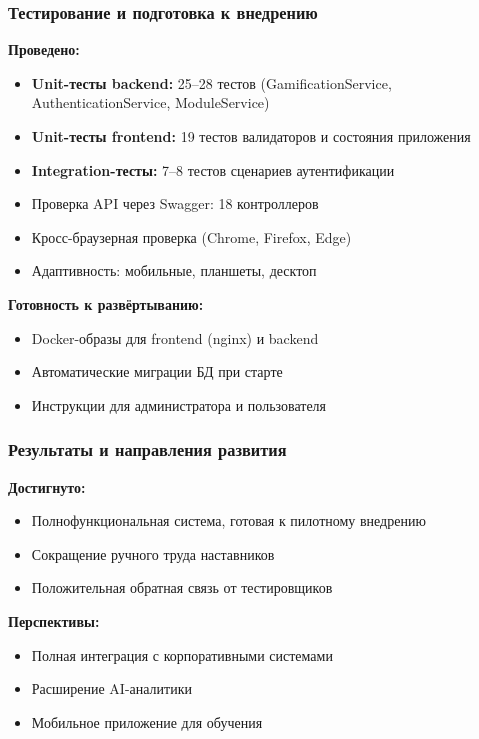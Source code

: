 \documentclass{beamer}
\begin{document}
\begin{frame}
    \frametitle{Тестирование и подготовка к внедрению}
    
    \textbf{Проведено:}
    \begin{itemize}
        \item \textbf{Unit-тесты backend:} 25--28 тестов (GamificationService, AuthenticationService, ModuleService)
        \item \textbf{Unit-тесты frontend:} 19 тестов валидаторов и состояния приложения
        \item \textbf{Integration-тесты:} 7--8 тестов сценариев аутентификации
        \item Проверка API через Swagger: 18 контроллеров
        \item Кросс-браузерная проверка (Chrome, Firefox, Edge)
        \item Адаптивность: мобильные, планшеты, десктоп
    \end{itemize}
    
    \vspace{0.3cm}
    \textbf{Готовность к развёртыванию:}
    \begin{itemize}
        \item Docker-образы для frontend (nginx) и backend
        \item Автоматические миграции БД при старте
        \item Инструкции для администратора и пользователя
    \end{itemize}
\end{frame}

\begin{frame}
    \frametitle{Результаты и направления развития}
    
    \textbf{Достигнуто:}
    \begin{itemize}
        \item Полнофункциональная система, готовая к пилотному внедрению
        \item Сокращение ручного труда наставников
        \item Положительная обратная связь от тестировщиков
    \end{itemize}
    
    \vspace{0.3cm}
    \textbf{Перспективы:}
    \begin{itemize}
        \item Полная интеграция с корпоративными системами
        \item Расширение AI-аналитики
        \item Мобильное приложение для обучения 
    \end{itemize}
\end{frame}
\end{document}
